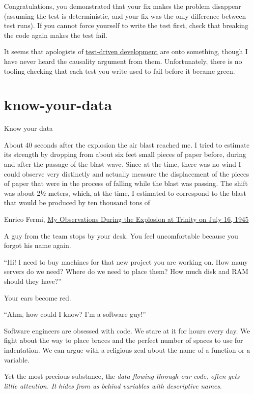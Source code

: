 \documentclass{article}
\begin{document}
Congratulations, you demonstrated that your fix makes the problem disappear (assuming the test is deterministic, and your fix was the only difference between test runs).
If you cannot force yourself to write the test first, check that breaking the code again makes the test fail.

It seems that apologists of \href{https://en.wikipedia.org/wiki/Test-driven_development}{test-driven development} are onto something, though I have never heard the causality argument from them.
Unfortunately, there is no tooling checking that each test you write used to fail before it became green.

\section{know-your-data}{Know your data}
\epigraph{
  About 40 seconds after the explosion the air blast reached me.
  I tried to estimate its strength by dropping from about six feet small pieces of paper before, during and after the passage of the blast wave.
  Since at the time, there was no wind I could observe very distinctly and actually measure the displacement of the pieces of paper that were in the process of falling while the blast was passing.
  The shift was about 2½ meters, which, at the time, I estimated to correspond to the blast that would be produced by ten thousand tons of 
}{Enrico Fermi, \href{https://www.atomicarchive.com/resources/documents/trinity/fermi.html}{My Observations During the Explosion at Trinity on July 16, 1945}}

A guy from the  team stops by your desk.
You feel uncomfortable because you forgot his name again.

``Hi! I need to buy machines for that new project you are working on.
How many servers do we need?
Where do we need to place them? 
How much disk and RAM should they have?''

Your ears become red.

``Ahm, how could I know? I'm a software guy!''

Software engineers are obsessed with code.
We stare at it for hours every day.
We fight about the way to place braces and the perfect number of spaces to use for indentation.
We can argue with a religious zeal about the name of a function or a variable.

Yet the most precious substance, the \em{data} flowing through our code, often gets little attention.
It hides from us behind variables with descriptive names.
\end{document}
